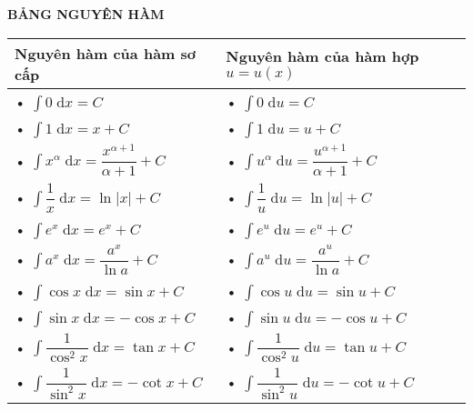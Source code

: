 \begin{center}
	\textbf{BẢNG NGUYÊN HÀM}
\end{center}
\begin{center}
	{\renewcommand\arraystretch{2}
		\begin{longtable}{|l|l|}
			\hline Nguyên hàm của hàm sơ cấp & 
			Nguyên hàm của hàm hợp $u=u(x)$ \\ 
			\hline \rule[-13pt]{0pt}{31pt} • $\displaystyle\int 0\;\text{d}x=C$ & • $\displaystyle\int 0\;\text{d}u=C$\\ 
			\hline\rule[-13pt]{0pt}{31pt} • $\displaystyle\int 1\;\text{d}x=x+C$ & • $\displaystyle\int 1\;\text{d}u=u+C$\\ 
			\hline \rule[-13pt]{0pt}{31pt} • $\displaystyle\int x^\alpha\;\text{d}x=\dfrac{x^{\alpha +1}}{\alpha+1}+ C$ & • $\displaystyle\int u^\alpha\;\text{d}u=\dfrac{u^{\alpha +1}}{\alpha+1}+ C$\\ 
			\hline\rule[-13pt]{0pt}{31pt} • $\displaystyle\int \dfrac{1}{x}\;\text{d}x=\ln \vert x\vert+C$ & • $\displaystyle\int \dfrac{1}{u}\;\text{d}u=\ln \vert u\vert+C$\\ 
			\hline \rule[-13pt]{0pt}{31pt} • $\displaystyle\int e^x\;\text{d}x=e^x+C$ & • $\displaystyle\int e^u\;\text{d}u=e^u+C$\\ 
			\hline \rule[-13pt]{0pt}{31pt} • $\displaystyle\int a^x\;\text{d}x=\dfrac{a^x}{\ln a}+C$ & • $\displaystyle\int a^u\;\text{d}u=\dfrac{a^u}{\ln a}+C$\\ 
			\hline \rule[-13pt]{0pt}{31pt} • $\displaystyle\int \cos x\;\text{d}x=\sin x+C$ & • $\displaystyle\int \cos u\;\text{d}u=\sin u+C$\\ 
			\hline \rule[-13pt]{0pt}{31pt} • $\displaystyle\int \sin x\;\text{d}x=-\cos x+C$ & • $\displaystyle\int \sin u\;\text{d}u=-\cos u+C$\\ 
			\hline \rule[-13pt]{0pt}{31pt} • $\displaystyle\int \dfrac{1}{\cos^2 x}\;\text{d}x=\tan x+C$ & • $\displaystyle\int \dfrac{1}{\cos^2 u}\;\text{d}u=\tan u+C$\\ 
			\hline \rule[-13pt]{0pt}{31pt} • $\displaystyle\int \dfrac{1}{\sin^2 x}\;\text{d}x=-\cot x+C$ & • $\displaystyle\int \dfrac{1}{\sin^2 u}\;\text{d}u=-\cot u+C$ \\
			\hline
		\end{longtable} 
	}
\end{center}
